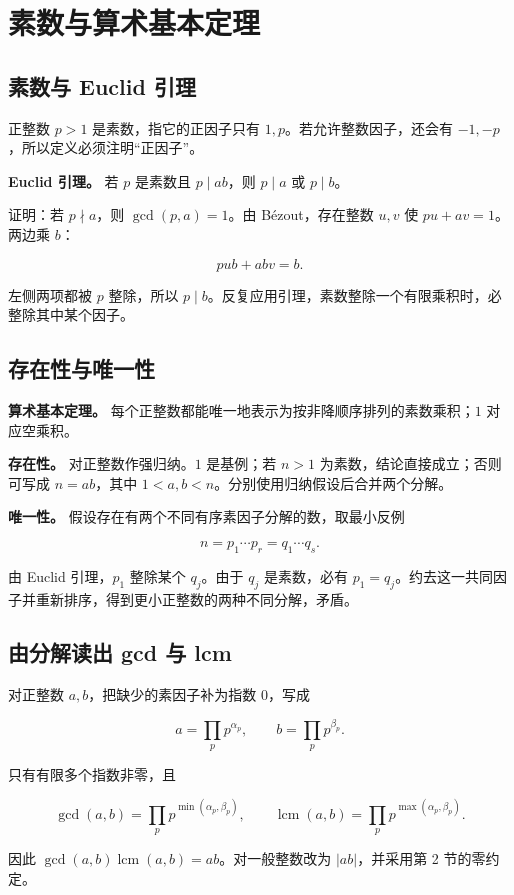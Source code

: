 \section{素数与算术基本定理}


\subsection{素数与 Euclid 引理}


正整数 $p>1$ 是素数，指它的正因子只有 $1,p$。若允许整数因子，还会有 $-1,-p$，所以定义必须注明“正因子”。

\textbf{Euclid 引理。} 若 $p$ 是素数且 $p\mid ab$，则 $p\mid a$ 或 $p\mid b$。

证明：若 $p\nmid a$，则 $\gcd(p,a)=1$。由 Bézout，存在整数 $u,v$ 使 $pu+av=1$。两边乘 $b$：

\[
pub+abv=b.
\]

左侧两项都被 $p$ 整除，所以 $p\mid b$。反复应用引理，素数整除一个有限乘积时，必整除其中某个因子。

\subsection{存在性与唯一性}


\textbf{算术基本定理。} 每个正整数都能唯一地表示为按非降顺序排列的素数乘积；$1$ 对应空乘积。

\textbf{存在性。} 对正整数作强归纳。$1$ 是基例；若 $n>1$ 为素数，结论直接成立；否则可写成 $n=ab$，其中 $1<a,b<n$。分别使用归纳假设后合并两个分解。

\textbf{唯一性。} 假设存在有两个不同有序素因子分解的数，取最小反例

\[
n=p_1\cdots p_r=q_1\cdots q_s.
\]

由 Euclid 引理，$p_1$ 整除某个 $q_j$。由于 $q_j$ 是素数，必有 $p_1=q_j$。约去这一共同因子并重新排序，得到更小正整数的两种不同分解，矛盾。

\subsection{由分解读出 gcd 与 lcm}


对正整数 $a,b$，把缺少的素因子补为指数 $0$，写成

\[
a=\prod_p p^{\alpha_p},\qquad b=\prod_p p^{\beta_p}.
\]

只有有限多个指数非零，且

\[
\gcd(a,b)=\prod_p p^{\min(\alpha_p,\beta_p)},\qquad
\operatorname{lcm}(a,b)=\prod_p p^{\max(\alpha_p,\beta_p)}.
\]

因此 $\gcd(a,b)\operatorname{lcm}(a,b)=ab$。对一般整数改为 $|ab|$，并采用第 2 节的零约定。
